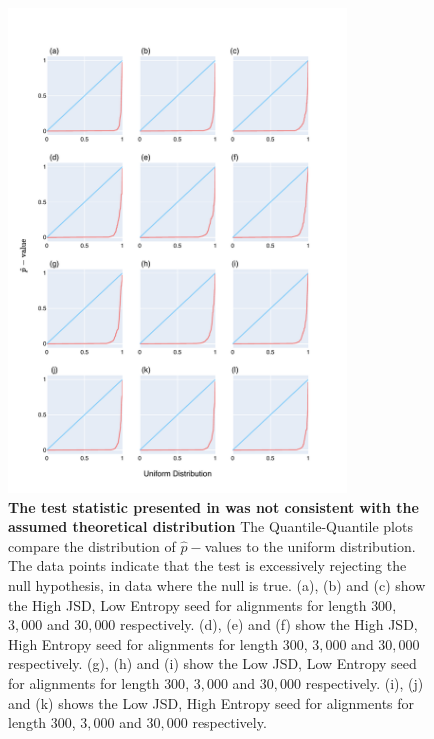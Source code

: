 \begin{figure}[!ht]
\centering
\includegraphics[width=0.8\textwidth]{figures/plots/synthetic/chi2/all_seeds.pdf}
\caption[The test statistic presented in \cite{Squartini2008QuantifyingProcess} was not consistent with the assumed theoretical distribution]{\textbf{The test statistic presented in \cite{Squartini2008QuantifyingProcess} was not consistent with the assumed theoretical distribution} The Quantile-Quantile plots compare the distribution of $\hat p-$values to the uniform distribution. The data points indicate that the test is excessively rejecting the null hypothesis, in data where the null is true. (a), (b) and (c) show the High JSD, Low Entropy seed for alignments for length $300$, $3,000$ and $30,000$ respectively. (d), (e) and (f) show the High JSD, High Entropy seed for alignments for length $300$, $3,000$ and $30,000$ respectively. (g), (h) and (i) show the Low JSD, Low Entropy seed for alignments for length $300$, $3,000$ and $30,000$ respectively. (i), (j) and (k) shows the Low JSD, High Entropy seed for alignments for length $300$, $3,000$ and $30,000$ respectively.}
\label{fig:synthetic/chi2/all-seeds}
\end{figure}